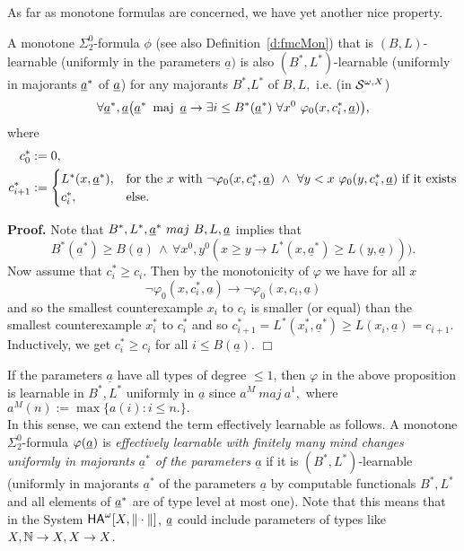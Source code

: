As far as monotone formulas are concerned, we have yet another nice property.
\begin{prop}\label{p:majBL}
A monotone $\Sigma^0_2$-formula $\phi$ (see also Definition~\ref{d:fmcMon}) that is $(B,L)$-learnable (uniformly in the parameters $\underline{a})$ 
is also $(B^*,L^*)$-learnable (uniformly in majorants $\underline a^*$ of 
$\underline a$) for any majorants $B^*$,$L^*$ of $B,L,$ i.e. 
(in ${\cal S}^{\omega,X}$)  
\[ \forall 
\underline{a}^*,\underline{a} \big( 
\underline{a}^* \ \operatorname{maj}\ \underline{a}\to 
\exists i\leq B^*(\underline a^*)\ \forall x^0\ \varphi_0(x,c^*_i,\underline a)\big),\] where
\begin{align*}
c^*_0&:=0,\\
c^*_{i+1}&:=
\begin{cases}
L^*(x, \underline a^*),&\text{for the $x$ with } \neg\varphi_0(x,c^*_i,\underline a)\ \wedge\ \forall y<x\ \varphi_0(y,c^*_i,\underline a) \text{ if it exists}\\
c^*_i,&\text{else}.
\end{cases}
\end{align*}
\end{prop}
{\bf Proof.} Note that $B^*,L^*,\underline a^* \ maj \ B,L,\underline a$ implies that 
\[ B^*(\underline{a}^*) \ge B(\underline{a}) \,\wedge\,\forall x^0,y^0 
(x\ge y\to L^*(x,\underline{a}^*)\ge L(y,\underline{a}))).\] 
Now assume that $c^*_i\ge c_i.$ Then by the monotonicity of $\varphi$ 
we have for all $x$ 
\[ \neg \varphi_0(x,c^*_i,\underline{a})\rightarrow \neg \varphi_0
(x,c_i,\underline{a}) \] 
and so the smallest counterexample $x_i$ to $c_i$ is smaller (or equal) 
than the smallest counterexample $x^*_i$ to $c^*_i$ and so 
$c^*_{i+1}=L^*(x^*_i,\underline{a}^*) \ge L(x_i,\underline{a})=c_{i+1}.$ 
Inductively, we get $c^*_i\ge c_i$ for all $i\le B(\underline{a}).$ 
\hfill $\Box$  
\begin{rmk} If the parameters $\underline{a}$ have all types of degree 
$\le 1$, then $\varphi$ in the above proposition is learnable in $B^*,L^*$ 
uniformly in $\underline{a}$ since $a^M \ maj \ a^1,$ where 
$a^M(n):=\max\{ a(i):i\le n.\}.$
\\ In this sense, we can extend the term effectively learnable as follows. A monotone $\Sigma^0_2$-formula $\varphi(\underline a)$ is 
{\em effectively learnable with finitely many mind changes uniformly in 
majorants $\underline{a}^*$ of the parameters $\underline{a}$} if it is 
$(B^*,L^*)$-learnable (uniformly in majorants $\underline{a}^*$ of the 
parameters $\underline{a}$ by computable functionals $B^*,L^*$ and all elements of $\underline a^*$ are of type level at most one). 
Note that this means that in the System ${\textsf{\upshape HA}}^\omega[X,\|\cdot\|]$, $\underline a$ could include parameters of types like $X,\mathbb{N}\to X,X\to X$.
\end{rmk}




